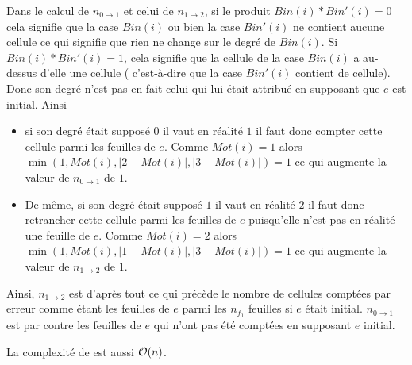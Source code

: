 Dans le calcul de $n_{0\rightarrow 1}$ et celui de $n_{1\rightarrow 2}$, si le produit $Bin(i)*Bin'(i)=0$ cela signifie que la case $Bin(i)$  ou bien la case $Bin'(i)$ ne contient aucune cellule ce qui signifie que rien ne change sur le degré de  $Bin(i)$. Si  $Bin(i)*Bin'(i)=1$, cela signifie que
la cellule de la case $Bin(i)$  a au-dessus d'elle une cellule ( c'est-à-dire que la case $Bin'(i)$ contient de cellule). Donc son degré n'est pas en fait celui  qui lui était attribué en supposant que $e$ est initial. Ainsi 
\begin{itemize}
\item si son degré était supposé $0$ il vaut en réalité $1$ il faut donc compter cette cellule parmi les feuilles de $e$. Comme $Mot(i)=1$ alors $\min(1,Mot(i), \vert 2-Mot(i)\vert,\vert 3-Mot(i)\vert)=1$ ce qui augmente la valeur de $n_{0\rightarrow 1}$ de $1$.
\item De même, si son degré était supposé $1$ il vaut en réalité $2$ il faut donc retrancher cette cellule parmi les feuilles de $e$ puisqu'elle n'est pas en réalité une feuille de $e$. Comme $Mot(i)=2$ alors $\min(1,Mot(i), \vert 1-Mot(i)\vert,\vert 3-Mot(i)\vert)=1$ ce qui augmente la valeur de $n_{1\rightarrow 2}$ de $1$.
\end{itemize}
 Ainsi, $n_{1\rightarrow 2}$ est d'après tout ce qui précède le nombre de cellules comptées par erreur comme étant les feuilles de $e$ parmi les $n_{f_{1}}$ feuilles si $e$ était initial. $n_{0\rightarrow 1}$ est par contre les feuilles de $e$ qui n'ont pas été comptées en supposant $e$ initial.  

La complexité de  est aussi $\mathcal{O} (n)$.

